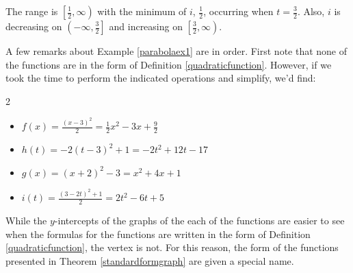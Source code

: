 \documentclass{ximera}
\begin{document}
\begin{example}
\begin{explanation}
\begin{enumerate}
\begin{center}
\begin{image}
\end{image}

\end{center}

The range is $\left[ \frac{1}{2}, \infty \right)$ with the minimum of $i$, $\frac{1}{2}$, occurring when $t = \frac{3}{2}$. Also, $i$ is decreasing on $\left(-\infty, \frac{3}{2} \right]$ and increasing on $\left[\frac{3}{2}, \infty \right)$.



\end{enumerate}




\end{explanation}

\end{example}

A few remarks about Example \ref{parabolaex1} are in order.  First note that none of the functions are in the form of Definition \ref{quadraticfunction}. However, if we took the time to perform the indicated operations and simplify, we'd find:

\begin{multicols}{2}

\begin{itemize}

\item  $f(x) = \frac{(x-3)^2}{2} = \frac{1}{2} x^2 - 3x + \frac{9}{2} $ 

\item  $h(t) = -2(t-3)^2+1 = -2t^2+12t-17$

\item  $g(x) = (x+2)^2 - 3 = x^2+4x+1$

\item  $i(t) = \frac{(3-2t)^2 +1}{2} = 2t^2-6t+5$ 

\end{itemize}

\end{multicols}

While the $y$-intercepts of the graphs of the each of the functions are easier to see when the formulas for the functions are written in the form of Definition \ref{quadraticfunction}, the vertex is not.  For this reason, the form of the functions presented in Theorem \ref{standardformgraph} are given a special name.
\end{document}
